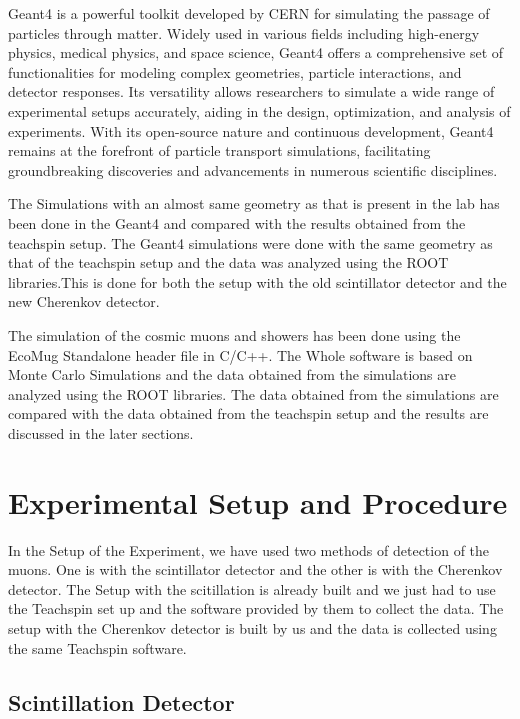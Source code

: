 \documentclass{article}
\begin{document}
\begin{multicols}{2}
Geant4 is a powerful toolkit developed by CERN for simulating the passage of particles through matter. Widely used in various fields including high-energy physics, medical physics, and space science, Geant4 offers a comprehensive set of functionalities for modeling complex geometries, particle interactions, and detector responses. Its versatility allows researchers to simulate a wide range of experimental setups accurately, aiding in the design, optimization, and analysis of experiments. With its open-source nature and continuous development, Geant4 remains at the forefront of particle transport simulations, facilitating groundbreaking discoveries and advancements in numerous scientific disciplines.

The Simulations with an almost same geometry as that is present in the lab has been done in the Geant4 and compared with the results obtained from the teachspin setup. The Geant4 simulations were done with the same geometry as that of the teachspin setup and the data was analyzed using the ROOT libraries.This is done for both the setup with the old scintillator detector and the new Cherenkov detector.

The simulation of the cosmic muons and showers has been done using the EcoMug Standalone header file in C/C++. The Whole software is based on Monte Carlo Simulations and the data obtained from the simulations are analyzed using the ROOT libraries. The data obtained from the simulations are compared with the data obtained from the teachspin setup and the results are discussed in the later sections.
\section{\label{expsetup}Experimental Setup and Procedure }

In the Setup of the Experiment, we have used two methods of detection of the muons. One is with the scintillator detector and the other is with the Cherenkov detector. The Setup with the scitillation is already built and we just had to use the Teachspin set up and the software provided by them to collect the data. The setup with the Cherenkov detector is built by us and the data is collected using the same Teachspin software.

\subsection{Scintillation Detector}


\end{multicols}
\end{document}
